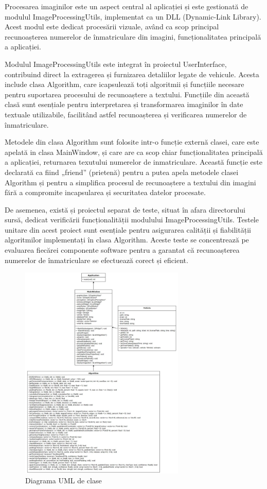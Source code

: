 \documentclass[a4paper,12pt]{report}
\begin{document}
Procesarea imaginilor este un aspect central al aplicației și este gestionată de modulul ImageProcessingUtils, implementat ca un DLL (Dynamic-Link Library). Acest modul este dedicat procesării vizuale, având ca scop principal recunoașterea numerelor de înmatriculare din imagini, funcționalitatea principală a aplicației.

Modulul ImageProcessingUtils este integrat în proiectul UserInterface, contribuind direct la extragerea și furnizarea detaliilor legate de vehicule. Acesta include clasa Algorithm, care icapsulează toți algoritmii și funcțiile necesare pentru suportarea procesului de recunoaștere a textului. Funcțiile din această clasă sunt esențiale pentru interpretarea și transformarea imaginilor în date textuale utilizabile, facilitând astfel recunoașterea și verificarea numerelor de înmatriculare.

Metodele din clasa Algorithm sunt folosite intr-o funcție externă clasei, care este apelată in clasa MainWindow, și care are ca scop chiar funcționalitatea principală a aplicației, returnarea texutului numerelor de inmatriculare. Această funcție este declarată ca fiind „friend” (prietenă) pentru a putea apela metodele clasei Algorithm și pentru a simplifica procesul de recunoaștere a textului din imagini fără a compromite incapsularea și securitatea datelor procesate.

De asemenea, există și proiectul separat de teste, situat în afara directorului sursă, dedicat verificării funcționalității modulului ImageProcessingUtils. Testele unitare din acest proiect sunt esențiale pentru asigurarea calității și fiabilității algoritmilor implementați în clasa Algorithm. Aceste teste se concentrează pe evaluarea fiecărei componente software pentru a garantat că recunoașterea numerelor de înmatriculare se efectuează corect și eficient.

\begin{figure}[h!]
    \centering
    \includegraphics[width=0.7\textwidth]{images/UML.jpg}
    \caption{Diagrama UML de clase}
\end{figure}
\FloatBarrier
\end{document}
